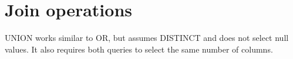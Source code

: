 \documentclass[english]{exam}
\begin{document}
	
    \section{Join operations}
    
     UNION works similar to OR, but assumes DISTINCT and does not select null values. It also requires both queries to select the same number of columns.
    
\end{document}
